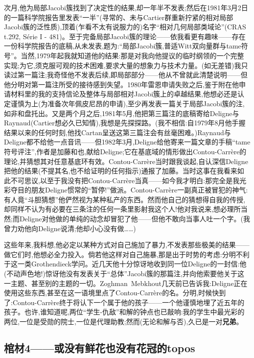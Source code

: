 次月,他为局部Jacobi簇找到了决定性的结果,却一年半不发表;然后在1981年3月2日的一篇科学院报告里发表“一半”(寻常的、未与Cartier群重新拧紧的相对局部Jacobi簇的泛性质),顶着(乍看不太有说服力的)名字“相对几何局部类域论”(CRAS t.292, Série I - 481)。至于完备局部Jacobi簇的理论——依我看更有趣味——存在一份科学院报告的底稿,从未发表,题为:“局部Jacobi簇,普适Witt双向量群与tame符号”。当然,1979年起我就知道他的结果:那是对我向他提议的临时纲领的一个完整实现;为它,须克服可观的技术困难,要求大量的想象力与技术力量。(如无差错)我只读过第一篇注;我奇怪他不发表后续,即局部部分——他从不曾就此清楚说明——但他分明对第一篇注所受的接待感到失望。1980年雷恩申请失败之后,鉴于附在他申请材料里的我的支持信\dmark{}论及整体与局部相对Jacobi簇上的卓越结果,他想必还是认定谨慎为上(为准备次年佩皮尼昂的申请),至少再发表一篇关于局部Jacobi簇的注,如非和盘托出。又是两个月之后,1981年5月,他把第三篇注的底稿寄给Deligne与Raynaud(Cartier想必久已知情),我想是先探探路。(我不相信:自1979年8月他手握结果以来的任何时刻,他找Cartan呈送这第三篇注会有丝毫困难。)Raynaud与Deligne都不给他一点音讯——但1982年3月,Deligne给他寄来一篇文章的手稿“tame符号评注”,作者是加藤和也,献给Deligne;它在基底域的情形做出Contou-Carrère的理论,并猜想其对任意基底环有效。Contou-Carrère当时跟我谈起,自认深信Deligne把他的结果(不提其名,也不给证明的任何指示)通报了加藤。当时这事在我看来如此不可思议,以至于我没有把Contou-Carrère当真——如今我才明白:那完全是我光彩夺目的朋友Deligne惯常的“暂停!”做派。Contou-Carrère一副真正被冒犯的神气:有人竟“斗胆猜想”他俨然视为某种私产的东西。然而他自己的猜想得自我的传授,却同样不认为有必要在三条注的任何一条里影射我这个人!他对我说来,想必理所当然;而Deligne对他做的单纯的动念却冒犯了他——但他不敢向当事人吐一个字。(我曾力劝他向Deligne说清;他却小心没有做……)

这些年来,我料想,他必定以某种方式对自己施加了暴力,不发表那些极美的结果——做它们时,他想必全力投入。倘若他这样对自己施暴,那是出于时势的考虑:分明不利于这一类Grothendieck学问。近几天他十分惊讶地收到同一位Deligne的一封信:他(不动声色地!)惊讶他没有发表关于“总体”Jacobi簇的那篇注,并向他索要他关于这一主题、甚至别的主题的一切。Zoghman~Mebkhout几天前已告诉我:Deligne正在使用这些东西,甚至在这一语境里点了Contou-Carrère的名。分明,时候快到了:Contou-Carrère终于将认下一个属于他的孩子——一个他谨慎地埋了近五年的孩子。也许,谁知道呢,两位“学生-仇敌”和解的钟点也已敲响:我的学生中最光彩的两位,一位是受勋的院士,一位是代理助教;然而(无论和解与否),久已是一对\textbf{兄弟}。

\subsection{棺材4——或没有鲜花也没有花冠的topos}

